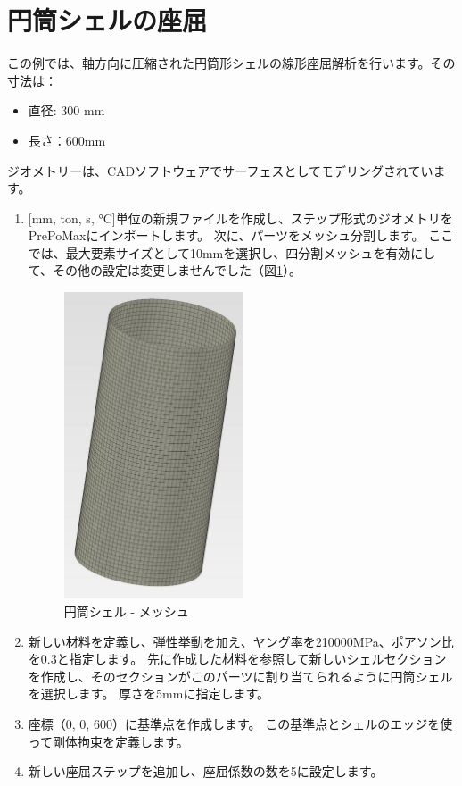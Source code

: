 \section{円筒シェルの座屈}
この例では、軸方向に圧縮された円筒形シェルの線形座屈解析を行います。その寸法は：
\begin{itemize}
\item 直径: 300 mm
\item 長さ：600mm
\end{itemize}
ジオメトリーは、CADソフトウェアでサーフェスとしてモデリングされています。
\begin{enumerate}
\item
  {[}mm, ton, s, °C{]}単位の新規ファイルを作成し、ステップ形式のジオメトリをPrePoMaxにインポートします。
  次に、パーツをメッシュ分割します。
  ここでは、最大要素サイズとして10mmを選択し、四分割メッシュを有効にして、その他の設定は変更しませんでした（図\ref{fig:09-01}）。
	\begin{figure}[H]
	\centering
	\includegraphics[width=53mm]{fig/09-01.png}
	\caption{円筒シェル - メッシュ}
	\label{fig:09-01}
	\end{figure}
	\vspace{-\baselineskip}
\item
  新しい材料を定義し、弾性挙動を加え、ヤング率を210000MPa、ポアソン比を0.3と指定します。
  先に作成した材料を参照して新しいシェルセクションを作成し、そのセクションがこのパーツに割り当てられるように円筒シェルを選択します。
  厚さを5mmに指定します。
\item
  座標（0, 0, 600）に基準点を作成します。
  この基準点とシェルのエッジを使って剛体拘束を定義します。
\item
  新しい座屈ステップを追加し、座屈係数の数を5に設定します。

\end{enumerate}

